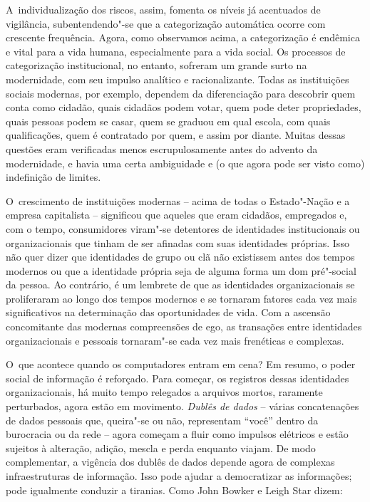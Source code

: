 A~individualização dos riscos, assim, fomenta os níveis já acentuados de
vigilância, subentendendo"-se que a categorização automática ocorre com
crescente frequência. Agora, como observamos acima, a categorização é
endêmica e vital para a vida humana, especialmente para a vida social.
Os processos de categorização institucional, no entanto, sofreram um
grande surto na modernidade, com seu impulso analítico e racionalizante.
Todas as instituições sociais modernas, por exemplo, dependem da
diferenciação para descobrir quem conta como cidadão, quais cidadãos
podem votar, quem pode deter propriedades, quais pessoas podem se casar,
quem se graduou em qual escola, com quais qualificações, quem é
contratado por quem, e assim por diante. Muitas dessas questões eram
verificadas menos escrupulosamente antes do advento da modernidade, e
havia uma certa ambiguidade e (o que agora pode ser visto como)
indefinição de limites.

O~crescimento de instituições modernas -- acima de todas o Estado"-Nação
e a empresa capitalista -- significou que aqueles que eram cidadãos,
empregados e, com o tempo, consumidores viram"-se detentores de
identidades institucionais ou organizacionais que tinham de ser afinadas
com suas identidades próprias. Isso não quer dizer que identidades de
grupo ou clã não existissem antes dos tempos modernos ou que a
identidade própria seja de alguma forma um dom pré"-social da pessoa. Ao
contrário, é um lembrete de que as identidades organizacionais se
proliferaram ao longo dos tempos modernos e se tornaram fatores cada vez
mais significativos na determinação das oportunidades de vida. Com a
ascensão concomitante das modernas compreensões de ego, as transações
entre identidades organizacionais e pessoais tornaram"-se cada vez mais
frenéticas e complexas.

O~que acontece quando os computadores entram em cena? Em resumo, o poder
social de informação é reforçado. Para começar, os registros dessas
identidades organizacionais, há muito tempo relegados a arquivos mortos,
raramente perturbados, agora estão em movimento. \emph{Dublês de dados}
-- várias concatenações de dados pessoais que, queira"-se ou não,
representam ``você'' dentro da burocracia ou da rede -- agora começam a
fluir como impulsos elétricos e estão sujeitos à alteração, adição,
mescla e perda enquanto viajam. De modo complementar, a vigência dos
dublês de dados depende agora de complexas infraestruturas de
informação. Isso pode ajudar a democratizar as informações; pode
igualmente conduzir a tiranias. Como John Bowker e Leigh Star dizem:

